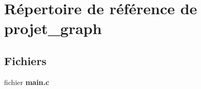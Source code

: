 \section{Répertoire de référence de projet\-\_\-graph}
\label{dir_262751a6d28867fbb30504460c0a6c51}
\subsection*{Fichiers}
\begin{DoxyCompactItemize}
\item 
fichier {\bf main.\-c}
\end{DoxyCompactItemize}
